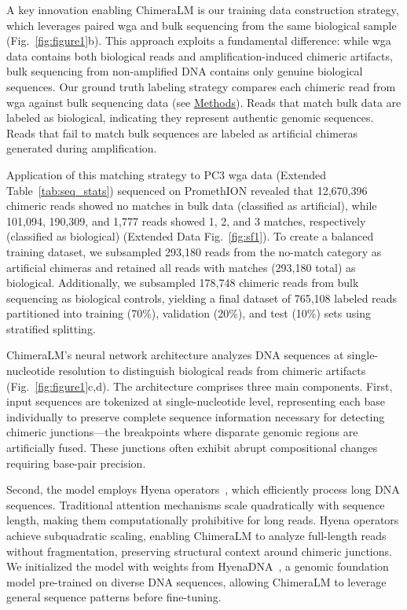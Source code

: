 \documentclass[pdflatex,sn-nature,lineno]{sn-jnl}%
\theoremstyle{thmstyleone}%
\theoremstyle{thmstyletwo}%
\theoremstyle{thmstylethree}%
\begin{document}
A key innovation enabling ChimeraLM is our training data construction strategy, which leverages paired \gls{wga} and bulk sequencing from the same biological sample (Fig.~\ref{fig:figure1}b).
This approach exploits a fundamental difference: while \gls{wga} data contains both biological reads and amplification-induced chimeric artifacts, bulk sequencing from non-amplified DNA contains only genuine biological sequences.
Our ground truth labeling strategy compares each chimeric read from \gls{wga} against bulk sequencing data (see \hyperref[sec:methods]{Methods}).
Reads that match bulk data are labeled as biological, indicating they represent authentic genomic sequences.
Reads that fail to match bulk sequences are labeled as artificial chimeras generated during amplification.

Application of this matching strategy to PC3 \gls{wga} data (Extended Table~\ref{tab:seq_stats}) sequenced on PromethION revealed that 12,670,396 chimeric reads showed no matches in bulk data (classified as artificial), while 101,094, 190,309, and 1,777 reads showed 1, 2, and 3 matches, respectively (classified as biological) (Extended Data Fig.~\ref{fig:sf1}).
To create a balanced training dataset, we subsampled 293,180 reads from the no-match category as artificial chimeras and retained all reads with matches (293,180 total) as biological.
Additionally, we subsampled 178,748 chimeric reads from bulk sequencing as biological controls, yielding a final dataset of 765,108 labeled reads partitioned into training (70\%), validation (20\%), and test (10\%) sets using stratified splitting.

ChimeraLM's neural network architecture analyzes DNA sequences at single-nucleotide resolution to distinguish biological reads from chimeric artifacts (Fig.~\ref{fig:figure1}c,d).
The architecture comprises three main components.
First, input sequences are tokenized at single-nucleotide level, representing each base individually to preserve complete sequence information necessary for detecting chimeric junctions—the breakpoints where disparate genomic regions are artificially fused.
These junctions often exhibit abrupt compositional changes requiring base-pair precision.

Second, the model employs Hyena operators~\cite{Poli2023HyenaHT}, which efficiently process long DNA sequences.
Traditional attention mechanisms scale quadratically with sequence length, making them computationally prohibitive for long reads.
Hyena operators achieve subquadratic scaling, enabling ChimeraLM to analyze full-length reads without fragmentation, preserving structural context around chimeric junctions.
We initialized the model with weights from HyenaDNA~\cite{nguyen2023hyenadna}, a genomic foundation model pre-trained on diverse DNA sequences, allowing ChimeraLM to leverage general sequence patterns before fine-tuning.
\end{document}
